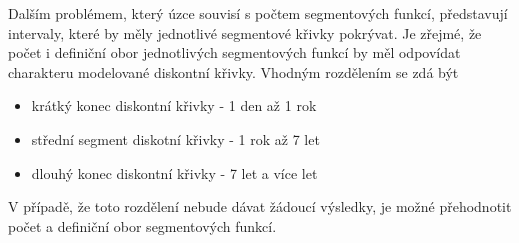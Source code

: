 \documentclass[a4paper]{book}
\begin{document}
Dalším problémem, který úzce souvisí s počtem segmentových funkcí, představují intervaly, které by měly jednotlivé segmentové křivky pokrývat. Je zřejmé, že počet i definiční obor jednotlivých segmentových funkcí by měl odpovídat charakteru modelované diskontní křivky. Vhodným rozdělením se zdá být
\begin{itemize}
\item krátký konec diskontní křivky - 1 den až 1 rok
\item střední segment diskotní křivky - 1 rok až 7 let
\item dlouhý konec diskontní křivky - 7 let a více let
\end{itemize}
V případě, že toto rozdělení nebude dávat žádoucí výsledky, je možné přehodnotit počet a definiční obor segmentových funkcí.\\
\end{document}
